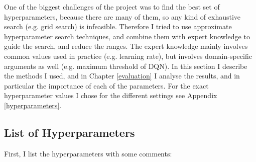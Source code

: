 One of the biggest challenges of the project was to find the best set of hyperparameters, because there are many of them, so any kind of exhaustive search (e.g. grid search) is infeasible. Therefore I tried to use approximate hyperparameter search techniques, and combine them with expert knowledge to guide the search, and reduce the ranges. The expert knowledge mainly involves common values used in practice (e.g. learning rate), but involves domain-specific arguments as well (e.g. maximum threshold of DQN). In this section I describe the methods I used, and in Chapter \ref{evaluation} I analyse the results, and in particular the importance of each of the parameters. For the exact hyperparameter values I chose for the different settings see Appendix \ref{hyperparameters}.


\subsection{List of Hyperparameters}


First, I list the hyperparameters with some comments:

